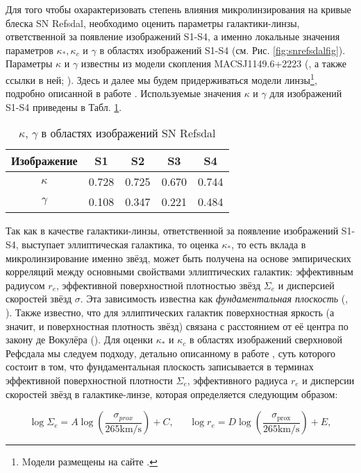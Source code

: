 Для того чтобы охарактеризовать степень влияния микролинзирования на кривые блеска SN Refsdal, необходимо оценить параметры галактики-линзы, ответственной за появление изображений S1-S4, а именно локальные значения параметров $\kappa_*, \kappa_c$ и $\gamma$ в областях изображений S1-S4  (см. Рис. \ref{fig:snrefsdalfig}). Параметры $\kappa$ и $\gamma$ известны из модели скопления MACSJ1149.6+2223 (\cite{treu2016}, а также ссылки в ней; \cite{hubblemaps}). Здесь и далее мы будем придерживаться модели линзы\footnote{Mодели размещены на сайте \cite{https://archive.stsci.edu/pub/hlsp/frontier/macs1149/models/}.}, подробно описанной в работе \cite{kawamataoguri}. Используемые значения $\kappa$ и $\gamma$ для изображений S1-S4 приведены в Табл. \ref{tab:kappagamma}.
\begin{table}[h!]
  \caption{$\kappa$, $\gamma$ в областях изображений SN Refsdal} 
  \label{tab:kappagamma}
  \centering
    \begin{tabular}{ | c | c | c | c | c |}
    \hline
    Изображение & S1 & S2 & S3 & S4 \\ \hline
    $\kappa$ & 0.728 & 0.725 & 0.670 & 0.744 \\ \hline
    $\gamma$ & 0.108 & 0.347 & 0.221 & 0.484 \\
    \hline
    \end{tabular}
\end{table}
Так как в качестве галактики-линзы, ответственной за появление изображений S1-S4, выступает эллиптическая галактика, то оценка $\kappa_*$, то есть вклада в микролинзирование именно звёзд, может быть получена на основе эмпирических корреляций между основными свойствами эллиптических галактик: эффективным радиусом $r_e$, эффективной поверхностной плотностью звёзд $\Sigma_e$ и дисперсией скоростей звёзд $\sigma$. Эта зависимость известна как \textit{фундаментальная плоскость} (\cite{djorgovski&davis1987}, \cite{hydebernardi2009}). Также известно, что для эллиптических галактик поверхностная яркость (а значит, и поверхностная плотность звёзд) связана с расстоянием от её центра по закону де Вокулёра (\cite{vaucouleurs}). Для оценки $\kappa_*$ и $\kappa_c$ в областях изображений сверхновой Рефсдала мы следуем подходу, детально описанному в работе \cite{schechter2014}, суть которого состоит в том, что фундаментальная плоскость записывается в терминах эффективной поверхностной плотности $\Sigma_{e}$, эффективного радиуса $r_e$ и дисперсии скоростей звёзд в галактике-линзе, которая определяется следующим образом:

\begin{equation}\label{sigrad}
\log \Sigma_{e}=A \log \left(\frac{\sigma_{p r o x}}{265  \mathrm{km} / \mathrm{s}}\right)+C, \ \ \ \ \ \ \ \log r_{e}=D \log \left(\frac{\sigma_{\text {prox}}}{265 \mathrm{km} / \mathrm{s}}\right)+E,
\end{equation}

